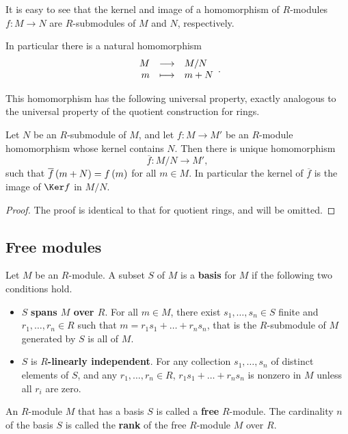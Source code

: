 It is easy to see that the kernel and image of a homomorphism of $ R $-modules $ f : M \to N $ are $ R $-submodules of $ M $ and $ N $, respectively.

\begin{note*}
In particular there is a natural homomorphism
$$ \function{M}{M / N}{m}{m + N}. $$
\end{note*}

This homomorphism has the following universal property, exactly analogous to the universal property of the quotient construction for rings.

\begin{proposition}
Let $ N $ be an $ R $-submodule of $ M $, and let $ f : M \to M' $ be an $ R $-module homomorphism whose kernel contains $ N $. Then there is unique homomorphism
$$ \overline{f} : M / N \to M', $$
such that $ \overline{f}\br{m + N} = f\br{m} $ for all $ m \in M $. In particular the kernel of $ \overline{f} $ is the image of $ \Ker f $ in $ M / N $.
\end{proposition}

\begin{proof}
The proof is identical to that for quotient rings, and will be omitted.
\end{proof}

\subsection{Free modules}

\begin{definition}
Let $ M $ be an $ R $-module. A subset $ S $ of $ M $ is a \textbf{basis} for $ M $ if the following two conditions hold.
\begin{itemize}
\item $ S $ \textbf{spans $ M $ over $ R $}. For all $ m \in M $, there exist $ s_1, \dots, s_n \in S $ finite and $ r_1, \dots, r_n \in R $ such that $ m = r_1s_1 + \dots + r_ns_n $, that is the $ R $-submodule of $ M $ generated by $ S $ is all of $ M $.
\item $ S $ is \textbf{$ R $-linearly independent}. For any collection $ s_1, \dots, s_n $ of distinct elements of $ S $, and any $ r_1, \dots, r_n \in R $, $ r_1s_1 + \dots + r_ns_n $ is nonzero in $ M $ unless all $ r_i $ are zero.
\end{itemize}
\end{definition}

\begin{definition}
An $ R $-module $ M $ that has a basis $ S $ is called a \textbf{free} $ R $-module. The cardinality $ n $ of the basis $ S $ is called the \textbf{rank} of the free $ R $-module $ M $ over $ R $.
\end{definition}

